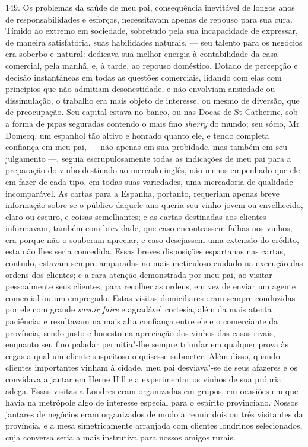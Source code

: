 149. Os problemas da saúde de meu pai, consequência inevitável de longos
anos de responsabilidades e esforços, necessitavam apenas de repouso
para sua cura. Tímido ao extremo em sociedade, sobretudo pela sua
incapacidade de expressar, de maneira satisfatória, suas habilidades
naturais, --- seu talento para os negócios era soberbo e natural:
dedicava sua melhor energia à contabilidade da casa comercial, pela
manhã, e, à tarde, ao repouso doméstico. Dotado de percepção e decisão
instantâneas em todas as questões comerciais, lidando com elas com
princípios que não admitiam desonestidade, e não envolviam ansiedade ou
dissimulação, o trabalho era mais objeto de interesse, ou mesmo de
diversão, que de preocupação. Seu capital estava no banco, ou nas Docas
de St Catherine, sob a forma de pipas seguradas contendo o mais fino
\emph{sherry} do mundo; seu sócio, Mr Domecq, um espanhol tão altivo e
honrado quanto ele, e tendo completa confiança em meu pai, --- não apenas
em sua probidade, mas também em seu julgamento ---, seguia
escrupulosamente todas as indicações de meu pai para a preparação do
vinho destinado ao mercado inglês, não menos empenhado que ele em fazer
de cada tipo, em todas suas variedades, uma mercadoria de qualidade
incomparável. As cartas para a Espanha, portanto, requeriam apenas breve
informação sobre se o público daquele ano queria seu vinho jovem ou
envelhecido, claro ou escuro, e coisas semelhantes; e as cartas
destinadas aos clientes informavam, também com brevidade, que caso
encontrassem falhas nos vinhos, era porque não o souberam apreciar, e
caso desejassem uma extensão do crédito, esta não lhes seria concedida.
Essas breves disposições espartanas nas cartas, contudo, estavam sempre
amparadas no mais meticuloso cuidado na execução das ordens dos
clientes; e a rara atenção demonstrada por meu pai, ao visitar
pessoalmente seus clientes, para recolher as ordens, em vez de enviar um
agente comercial ou um empregado. Estas visitas domiciliares eram sempre
conduzidas por ele com grande \emph{savoir faire} e agradável cortesia,
além da mais atenta paciência: e resultavam na mais alta confiança entre
ele e o comerciante da província, sendo justo e honesto na apreciação
dos vinhos das casas rivais, enquanto seu fino paladar permitia"-lhe
sempre triunfar em qualquer prova às cegas a qual um cliente suspeitoso
o quisesse submeter. Além disso, quando clientes importantes vinham à
cidade, meu pai desviava"-se de seus afazeres e os convidava a jantar em
Herne Hill e a experimentar os vinhos de sua própria adega. Essas
visitas a Londres eram organizadas em grupos, em ocasiões em que havia
na metrópole algo de interesse especial para o espírito provinciano.
Nossos jantares de negócios eram organizados de modo a reunir dois ou
três visitantes da província, e a mesa simetricamente arranjada com
clientes londrinos selecionados, cuja conversa seria a mais instrutiva
para nossos amigos rurais.

